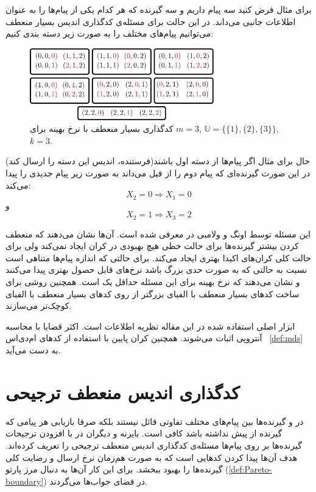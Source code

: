 برای مثال فرض کنید سه پیام داریم و سه گیرنده که هر کدام یکی از پیام‌ها را به عنوان اطلاعات جانبی می‌داند. در این حالت برای مسئله‌ی کدگذاری اندیس بسیار منعطف می‌توانیم پیام‌های مختلف را به صورت زیر دسته بندی کنیم:
\begin{figure}[H]
	\centering
	\includegraphics[width=8cm]{figs/chapter4/Alpha3}
	\caption[
	مثالی از کدگذاری بسیار منعطف با نرخ بهینه
	]{
		کدگذاری بسیار منعطف با نرخ بهینه برای
		$m=3$, 
		$\mathbb{U} = \big\{ \{1\}, \{2\}, \{3\} \big\}$,
		$k=3$.
	}
	\label{fig:eg:0}
\end{figure}
حال برای مثال اگر پیام‌ها از دسته اول باشند(فرستنده، اندیس این دسته را ارسال کند) در این صورت گیرنده‌ای که پیام دوم را از قبل می‌داند به صورت زیر پیام جدیدی را پیدا می‌کند:
$$X_2 = 0 \Rightarrow X_1 = 0$$
و
$$X_2 = 1 \Rightarrow X_3 = 2$$


این مسئله توسط اونگ و ولامبی در
\cite{verypliable}
معرفی شده است. آن‌ها نشان می‌دهند که منعطف کردن بیشتر گیرنده‌ها برای حالت خطی هیچ بهبودی در کران ایجاد نمی‌کند ولی برای حالت کلی کران‌های اکیدا بهتری ایجاد می‌کند. برای حالتی که اندازه پیام‌ها متناهی است نسبت به حالتی که به صورت حدی بزرگ باشد نرخ‌های قابل حصول بهتری پیدا می‌کنند و  نشان می‌دهند که نرخ بهینه برای این مسئله حداقل یک است. همچنین روشی برای ساخت کدهای بسیار منعطف با الفبای بزرگتر از روی کدهای بسیار منعطف با الفبای کوچک‌تر می‌سازند.

ابزار اصلی استفاده شده در این مقاله نظریه اطلاعات است. اکثر قضایا با محاسبه آنتروپی اثبات می‌شوند. همچنین کران پایین با استفاده از
 کدهای ام‌دی‌اس
 ~\autoref{def:mds}
به دست می‌آید.


\section{کدگذاری اندیس منعطف ترجیحی}
در 
\icod
 و 
 \picod
 گیرنده‌ها بین پیام‌های مختلف تفاوتی قائل نیستند بلکه صرفا بازیابی هر پیامی که گیرنده از پیش نداشته باشد کافی است. بایرنه و دیگران در
\cite{byrne2023preferential}
با افزودن ترجیحات گیرنده‌ها بر روی پیام‌ها مسئله‌ی کدگذاری اندیس منعطف ترجیحی را تعریف کرده‌اند. هدف آن‌ها پیدا کردن کدهایی است که به صورت هم‌زمان نرخ ارسال و رضایت کلی گیرنده‌ها را بهبود ببخشد. برای این کار آن‌ها به دنبال مرز پارتو (\autoref{def:Pareto-boundary})
 در فضای جواب‌ها می‌گردند.
 
